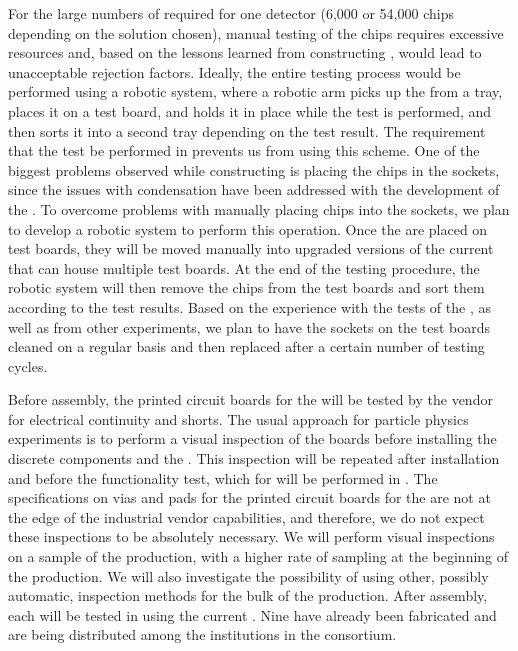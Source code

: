 For the large numbers of
 required for one   detector
(6,000 or 54,000 chips depending on the  solution
chosen), manual testing of the chips requires excessive 
resources and, based on the lessons learned from  
constructing  , would lead to unacceptable rejection
factors. Ideally, the entire testing
process would be performed using a robotic system, where 
a robotic arm picks up the  from a tray, places
it on a test board, and holds it in place while the test
is performed, and then sorts it into a second tray
depending on the test result. The requirement that the test
be performed in \lntwo prevents us from using this
scheme. One of the biggest problems observed while constructing
 is placing the chips in
the sockets, since the issues with condensation
have been addressed with the development of the .
To overcome problems with manually placing chips into
the sockets, we plan to develop a robotic system
to perform this operation. Once the  are 
placed on test boards, they will be moved manually into 
upgraded versions of the current  that can
house multiple test boards. At the end of the testing
procedure, the robotic system will then remove
the chips from the test boards and sort them according to
the test results. Based on the experience with the tests of
the  , as well as from other experiments,
we plan to have the sockets on the test boards cleaned on a regular 
basis and then replaced after a certain number of
testing cycles. 

Before assembly, the printed circuit boards for the
 will be tested by the vendor for electrical
continuity and shorts. The usual approach for particle physics
experiments is to perform a visual inspection of the boards
before installing the discrete components and 
the . This inspection will be repeated after 
installation and before the functionality test, which for  will
be performed in \lntwo. The specifications on vias and pads for the printed
circuit boards for the  are not at the edge of the
industrial vendor capabilities, and therefore, we do not
expect these inspections to be absolutely necessary. We will
perform visual inspections on a sample of the 
production, with a higher rate of sampling at the beginning
of the production. We will also investigate the possibility
of using other, possibly automatic, inspection methods for
the bulk of the production. After assembly, 
each  will be tested in \lntwo using
the current . Nine  have already been
fabricated and are being distributed among the institutions
in the consortium. 

